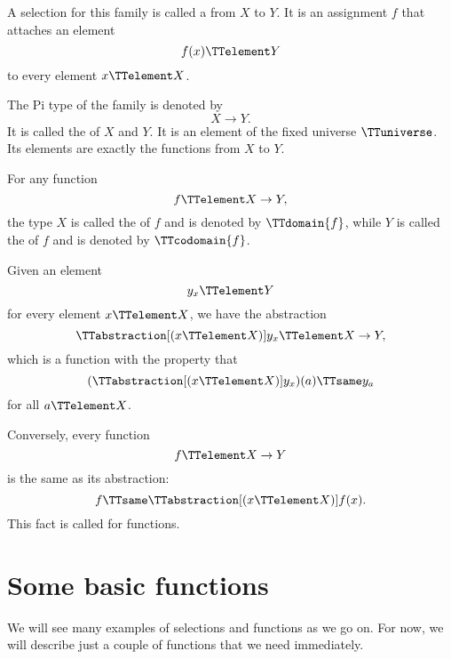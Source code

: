 \documentclass{article}
\begin{document}
A selection for this family is called a  from
$X$ to $Y$.  It is an assignment $f$ that attaches an element
\begin{equation*}
  f(x) \TTelement Y
\end{equation*}
to every element $x \TTelement X$.

The Pi type of the family is denoted by
\begin{equation*}
  X \to Y.
\end{equation*}
It is called the  of $X$ and $Y$.  It is an
element of the fixed universe $\TTuniverse$.  Its elements are exactly
the functions from $X$ to $Y$.

For any function
\begin{equation*}
  f \TTelement X \to Y,
\end{equation*}
the type $X$ is called the  of $f$ and is denoted
by $\TTdomain{f}$, while $Y$ is called the  of
$f$ and is denoted by $\TTcodomain{f}$.

Given an element
\begin{equation*}
  y_x \TTelement Y
\end{equation*}
for every element $x \TTelement X$, we have the abstraction
\begin{equation*}
  \TTabstraction[(x \TTelement X)] y_x \TTelement X \to Y,
\end{equation*}
which is a function with the property that
\begin{equation*}
  (\TTabstraction[(x \TTelement X)] y_x) (a) \TTsame y_a
\end{equation*}
for all $a \TTelement X$.

Conversely, every function
\begin{equation*}
  f \TTelement X \to Y
\end{equation*}
is the same as its abstraction:
\begin{equation*}
  f \TTsame \TTabstraction[(x \TTelement X)] f(x).
\end{equation*}
This fact is called  for functions.

\section{Some basic functions}
\label{sec:some-basic-functions}

We will see many examples of selections and functions as we go on.
For now, we will describe just a couple of functions that we need
immediately.
\end{document}
